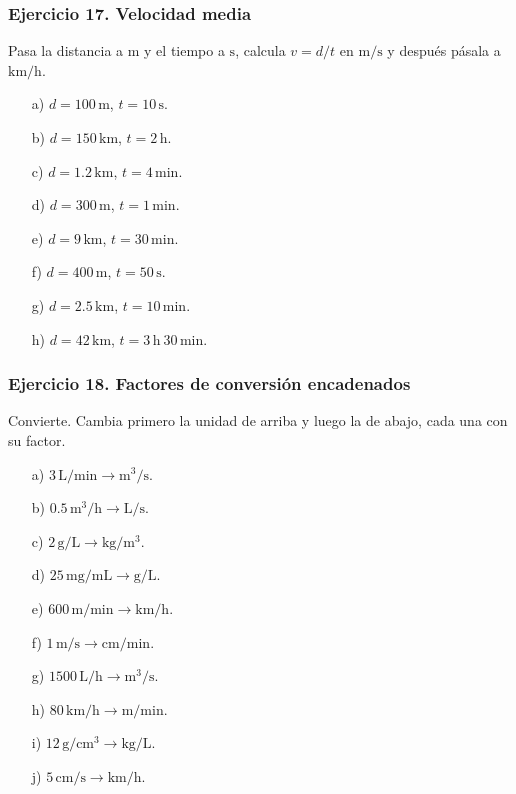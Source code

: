 \subsubsection*{Ejercicio 17. Velocidad media}

Pasa la distancia a $\mathrm{m}$ y el tiempo a $\mathrm{s}$,
calcula $v=d/t$ en $\mathrm{m/s}$ y después pásala a $\mathrm{km/h}$.

\begin{enumerate}
    \item[a)] $d=100\,\mathrm{m}$, $t=10\,\mathrm{s}$.
    \item[b)] $d=150\,\mathrm{km}$, $t=2\,\mathrm{h}$.
    \item[c)] $d=1.2\,\mathrm{km}$, $t=4\,\mathrm{min}$.
    \item[d)] $d=300\,\mathrm{m}$, $t=1\,\mathrm{min}$.
    \item[e)] $d=9\,\mathrm{km}$, $t=30\,\mathrm{min}$.
    \item[f)] $d=400\,\mathrm{m}$, $t=50\,\mathrm{s}$.
    \item[g)] $d=2.5\,\mathrm{km}$, $t=10\,\mathrm{min}$.
    \item[h)] $d=42\,\mathrm{km}$,
    $t=3\,\mathrm{h}\ 30\,\mathrm{min}$.
\end{enumerate}

\subsubsection*{Ejercicio 18. Factores de conversión encadenados}

Convierte. Cambia primero la unidad de arriba y luego la de abajo,
cada una con su factor.

\begin{enumerate}
    \item[a)] $3\,\mathrm{L/min}\rightarrow\mathrm{m^3/s}$.
    \item[b)] $0.5\,\mathrm{m^3/h}\rightarrow\mathrm{L/s}$.
    \item[c)] $2\,\mathrm{g/L}\rightarrow\mathrm{kg/m^3}$.
    \item[d)] $25\,\mathrm{mg/mL}\rightarrow\mathrm{g/L}$.
    \item[e)] $600\,\mathrm{m/min}\rightarrow\mathrm{km/h}$.
    \item[f)] $1\,\mathrm{m/s}\rightarrow\mathrm{cm/min}$.
    \item[g)] $1500\,\mathrm{L/h}\rightarrow\mathrm{m^3/s}$.
    \item[h)] $80\,\mathrm{km/h}\rightarrow\mathrm{m/min}$.
    \item[i)] $12\,\mathrm{g/cm^3}\rightarrow\mathrm{kg/L}$.
    \item[j)] $5\,\mathrm{cm/s}\rightarrow\mathrm{km/h}$.
\end{enumerate}


